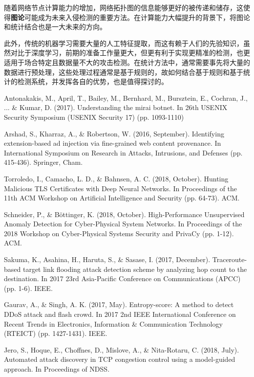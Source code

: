 \documentclass[12pt]{article} %
\begin{document}
随着网络节点计算能力的增加，网络拓扑图的信息能够更好的被传递和储存，这使得\textbf{图论}可能成为未来入侵检测的重要方法。在计算能力大幅提升的背景下，将图论和统计结合也是一大未来的方向。

此外，传统的机器学习需要大量的人工特征提取，而这有赖于人们的先验知识，虽然对比于深度学习，前期的准备工作量更大，但更有利于实现更精准的检测，也更适用于场合特定且数据量不大的攻击检测。在统计方法中，通常需要事先将大量的数据进行预处理，这些处理过程通常是基于规则的，故如何结合基于规则和基于统计的检测系统，并发挥各自的优势，也是值得探讨的。

\begin{thebibliography}{99}

 Antonakakis, M., April, T., Bailey, M., Bernhard, M., Bursztein, E., Cochran, J., ... \& Kumar, D. (2017). Understanding the mirai botnet. In 26th {USENIX} Security Symposium ({USENIX} Security 17) (pp. 1093-1110)

 Arshad, S., Kharraz, A., \& Robertson, W. (2016, September). Identifying extension-based ad injection via fine-grained web content provenance. In International Symposium on Research in Attacks, Intrusions, and Defenses (pp. 415-436). Springer, Cham.

 Torroledo, I., Camacho, L. D., \& Bahnsen, A. C. (2018, October). Hunting Malicious TLS Certificates with Deep Neural Networks. In Proceedings of the 11th ACM Workshop on Artificial Intelligence and Security (pp. 64-73). ACM.

 Schneider, P., \& Böttinger, K. (2018, October). High-Performance Unsupervised Anomaly Detection for Cyber-Physical System Networks. In Proceedings of the 2018 Workshop on Cyber-Physical Systems Security and PrivaCy (pp. 1-12). ACM.

 Sakuma, K., Asahina, H., Haruta, S., \& Sasase, I. (2017, December). Traceroute-based target link flooding attack detection scheme by analyzing hop count to the destination. In 2017 23rd Asia-Pacific Conference on Communications (APCC) (pp. 1-6). IEEE.

 Gaurav, A., \& Singh, A. K. (2017, May). Entropy-score: A method to detect DDoS attack and flash crowd. In 2017 2nd IEEE International Conference on Recent Trends in Electronics, Information \& Communication Technology (RTEICT) (pp. 1427-1431). IEEE.

 Jero, S., Hoque, E., Choffnes, D., Mislove, A., \& Nita-Rotaru, C. (2018, July). Automated attack discovery in TCP congestion control using a model-guided approach. In Proceedings of NDSS.


\end{thebibliography}
\end{document}
